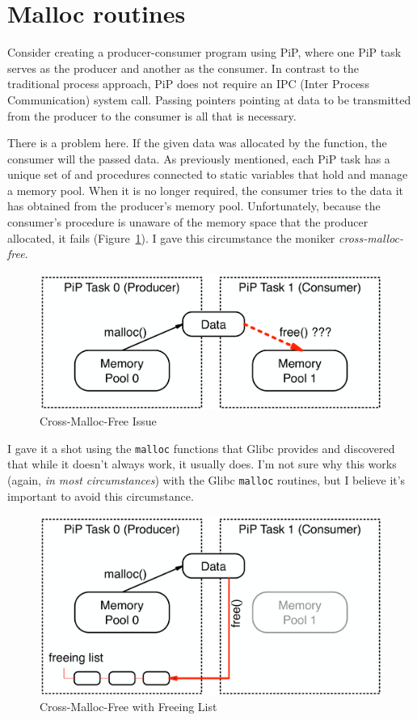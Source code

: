 
\section{Malloc routines}\label{sec:malloc}

Consider creating a producer-consumer program using PiP, where one PiP
task serves as the producer and another as the consumer. In contrast
to the traditional process approach, PiP does not require an IPC
(Inter Process Communication) system call. Passing pointers pointing
at data to be transmitted from the producer to the consumer is all
that is necessary.  

There is a problem here. If the given data was allocated by the
 function, the consumer will  the
passed data. As previously mentioned, each PiP task has a unique set
of  and  procedures connected to
static variables that hold and manage a memory pool. When it is no
longer required, the consumer tries to  the data it
has obtained from the producer's memory pool. Unfortunately, 
because the consumer's  procedure is unaware of the
memory space that the producer allocated, it fails
(Figure~\ref{fig:cross-malloc-free-issue}). I gave this circumstance
the moniker {\it cross-malloc-free}. 

\begin{figure}[ht]
\centering
\includegraphics[width=0.7\columnwidth]{malloc/Figs/ProducerConsumer.pdf}
\caption{Cross-Malloc-Free Issue}
\label{fig:cross-malloc-free-issue}
\end{figure}

I gave it a shot using the {\tt malloc} functions that Glibc provides
and discovered that while it doesn't always work, it usually does. I'm
not sure why this works (again, {\it in most circumstances}) with the 
Glibc {\tt malloc} routines, but I believe it's important to avoid
this circumstance.

\begin{figure}[ht]
\centering
\includegraphics[width=0.7\columnwidth]{malloc/Figs/CrossMallocFree.pdf}
\caption{Cross-Malloc-Free with Freeing List}
\label{fig:cross-malloc-free}
\end{figure}

